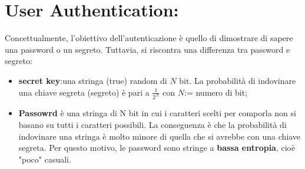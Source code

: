 \documentclass{book}
\theoremstyle{remark}
\begin{document}
\chapter{User Authentication:\@Password}
Concettualmente, l'obiettivo dell'autenticazione è quello di dimostrare di sapere una password o un segreto\@. Tuttavia, si riscontra una differenza tra password e segreto:\begin{itemize}
	\item \textbf{secret key}: una stringa (true) random di \(N\) bit\@. La probabilità di indovinare una chiave segreta (segreto) è pari a \(\frac{1}{2^N}\) con \(N\):= numero di bit;\@
	\item \textbf{Passowrd} è una stringa di N bit in cui i caratteri scelti per comporla non si basano su tutti i caratteri possibili\@. La conseguenza è che la probabilità di indovinare una stringa è molto minore di quella che si avrebbe con una chiave segreta\@. Per questo motivo, le password sono stringe a \textbf{bassa entropia}, cioè "poco" casuali\@.
\end{itemize}
\end{document}
